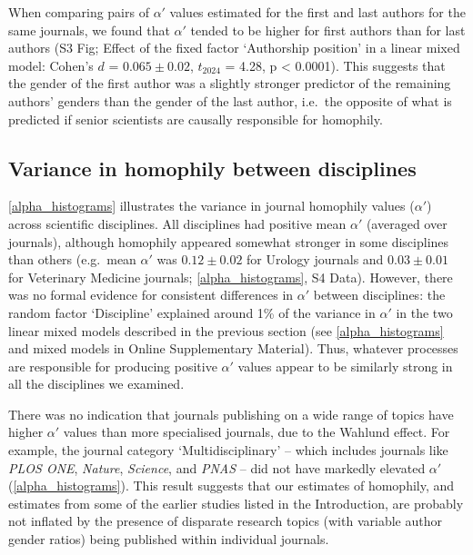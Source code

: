 \documentclass[12pt,]{article}
\begin{document}
When comparing pairs of \(\alpha'\) values estimated for the first and
last authors for the same journals, we found that \(\alpha'\) tended to
be higher for first authors than for last authors (S3 Fig; Effect of the
fixed factor `Authorship position' in a linear mixed model: Cohen's
\(d\) = \(0.065{\pm}0.02\), \(t_{2024}\) = 4.28, p \textless{} 0.0001).
This suggests that the gender of the first author was a slightly
stronger predictor of the remaining authors' genders than the gender of
the last author, i.e.~the opposite of what is predicted if senior
scientists are causally responsible for homophily.

\subsection{Variance in homophily between
disciplines}\label{variance-in-homophily-between-disciplines}

\autoref{alpha_histograms} illustrates the variance in journal homophily
values (\(\alpha'\)) across scientific disciplines. All disciplines had
positive mean \(\alpha'\) (averaged over journals), although homophily
appeared somewhat stronger in some disciplines than others (e.g.~mean
\(\alpha'\) was \(0.12{\pm}0.02\) for Urology journals and
\(0.03{\pm}0.01\) for Veterinary Medicine journals;
\autoref{alpha_histograms}, S4 Data). However, there was no formal
evidence for consistent differences in \(\alpha'\) between disciplines:
the random factor `Discipline' explained around 1\% of the variance in
\(\alpha'\) in the two linear mixed models described in the previous
section (see \autoref{alpha_histograms} and mixed models in Online
Supplementary Material). Thus, whatever processes are responsible for
producing positive \(\alpha'\) values appear to be similarly strong in
all the disciplines we examined.

There was no indication that journals publishing on a wide range of
topics have higher \(\alpha'\) values than more specialised journals,
due to the Wahlund effect. For example, the journal category
`Multidisciplinary' -- which includes journals like \emph{PLOS ONE},
\emph{Nature}, \emph{Science}, and \emph{PNAS} -- did not have markedly
elevated \(\alpha'\) (\autoref{alpha_histograms}). This result suggests
that our estimates of homophily, and estimates from some of the earlier
studies listed in the Introduction, are probably not inflated by the
presence of disparate research topics (with variable author gender
ratios) being published within individual journals.
\end{document}
